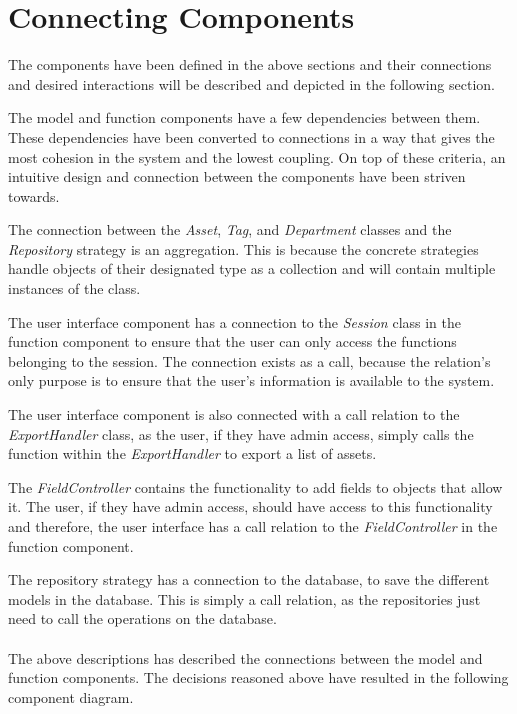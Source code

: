 \section{Connecting Components} \label{sc:connecting_components}
The components have been defined in the above sections and their connections and desired interactions will be described and depicted in the following section.
\par
The model and function components have a few dependencies between them. These dependencies have been converted to connections in a way that gives the most cohesion in the system and the lowest coupling. On top of these criteria, an intuitive design and connection between the components have been striven towards.
\par
The connection between the \textit{Asset}, \textit{Tag}, and \textit{Department} classes and the \textit{Repository} strategy is an aggregation. This is because the concrete strategies handle objects of their designated type as a collection and will contain multiple instances of the class.
\par
The user interface component has a connection to the \textit{Session} class in the function component to ensure that the user can only access the functions belonging to the session. The connection exists as a call, because the relation's only purpose is to ensure that the user's information is available to the system.
\par
The user interface component is also connected with a call relation to the \textit{ExportHandler} class, as the user, if they have admin access, simply calls the function within the \textit{ExportHandler} to export a list of assets.
\par
The \textit{FieldController} contains the functionality to add fields to objects that allow it. The user, if they have admin access, should have access to this functionality and therefore, the user interface has a call relation to the \textit{FieldController} in the function component.
\par
The repository strategy has a connection to the database, to save the different models in the database. This is simply a call relation, as the repositories just need to call the operations on the database.
\\\\
The above descriptions has described the connections between the model and function components. The decisions reasoned above have resulted in the following component diagram.

